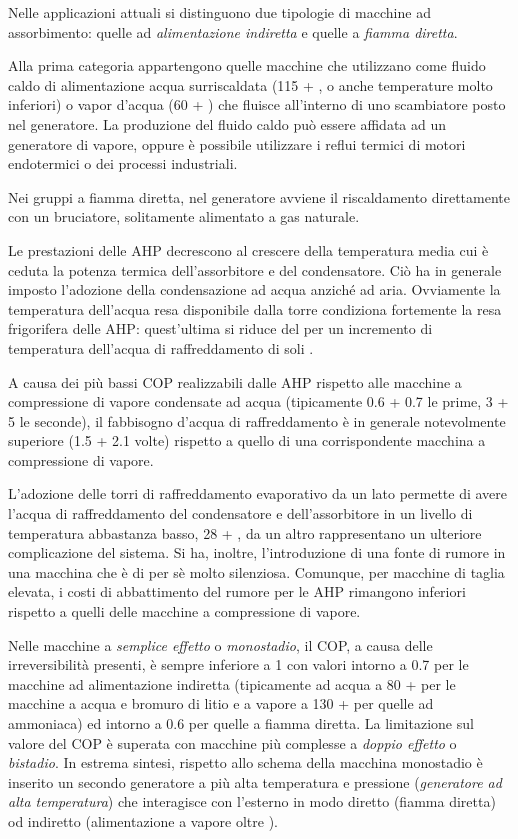 Nelle applicazioni attuali si distinguono due tipologie di macchine ad assorbimento: quelle ad \emph{alimentazione indiretta} e quelle a \emph{fiamma diretta}.

Alla prima categoria appartengono quelle macchine che utilizzano come fluido caldo di alimentazione acqua surriscaldata (\num{115} + , o anche temperature molto inferiori) o vapor d'acqua (\num{60} + ) che fluisce all'interno di uno scambiatore posto nel generatore. La produzione del fluido caldo può essere affidata ad un generatore di vapore, oppure è possibile utilizzare i reflui termici di motori endotermici o dei processi industriali.

Nei gruppi a fiamma diretta, nel generatore avviene il riscaldamento direttamente con un bruciatore, solitamente alimentato a gas naturale.

Le prestazioni delle AHP decrescono al crescere della temperatura media cui è ceduta la potenza termica dell'assorbitore e del condensatore. Ciò ha in generale imposto l'adozione della condensazione ad acqua anziché ad aria. Ovviamente la temperatura dell'acqua resa disponibile dalla torre condiziona fortemente la resa frigorifera delle AHP: quest'ultima si riduce del  per un incremento di temperatura dell'acqua di raffreddamento di soli .

A causa dei più bassi COP realizzabili dalle AHP rispetto alle macchine a compressione di vapore condensate ad acqua (tipicamente \num{0.6} + \num{0.7} le prime, \num{3} + \num{5} le seconde), il fabbisogno d'acqua di raffreddamento è in generale notevolmente superiore (\num{1.5} + \num{2.1} volte) rispetto a quello di una corrispondente macchina a compressione di vapore. 

L'adozione delle torri di raffreddamento evaporativo da un lato permette di avere l'acqua di raffreddamento del condensatore e dell'assorbitore in un livello di temperatura abbastanza basso, \num{28} + , da un altro rappresentano un ulteriore complicazione del sistema. Si ha, inoltre, l'introduzione di una fonte di rumore in una macchina che è di per sè molto silenziosa. Comunque, per macchine di taglia elevata, i costi di abbattimento del rumore per le AHP rimangono inferiori rispetto a quelli delle macchine a compressione di vapore. 

Nelle macchine a \emph{semplice effetto} o \emph{monostadio}, il COP, a causa delle irreversibilità presenti, è sempre inferiore a \num{1} con valori intorno a \num{0.7} per le macchine ad alimentazione indiretta (tipicamente ad acqua a \num{80} +  per le macchine a acqua e bromuro di litio e a vapore a \num{130} +  per quelle ad ammoniaca) ed intorno a \num{0.6} per quelle a fiamma diretta. La limitazione sul valore del COP è superata con macchine più complesse a \emph{doppio effetto} o \emph{bistadio}. In estrema sintesi, rispetto allo schema della macchina monostadio è inserito un secondo generatore a più alta temperatura e pressione (\emph{generatore ad alta temperatura}) che interagisce con l'esterno in modo diretto (fiamma diretta) od indiretto (alimentazione a vapore oltre ).

